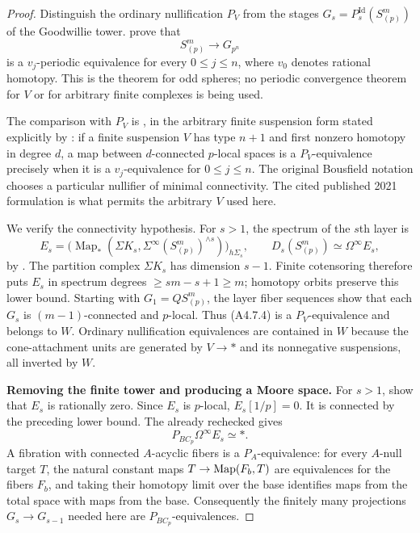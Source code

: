 \begin{proof}
Distinguish the ordinary nullification $P_V$ from the stages
$G_s=P_s^{\mathrm{Id}}(S^m_{(p)})$ of the Goodwillie tower.
\citet[Theorem~4.1, pp.~777--780]{EH5AroneMahowald1999}
prove that
\[
                  S^m_{(p)}\longrightarrow G_{p^n}
                  \tag{A4.7.4}
\]
is a $v_j$-periodic equivalence for every $0\leq j\leq n$,
where $v_0$ denotes rational homotopy.  This is the theorem
for odd spheres; no periodic convergence theorem for $V$ or
for arbitrary finite complexes is being used.

The comparison with $P_V$ is
\citet[Corollary~4.8, with the conventions of Section~4.3]{A3Bousfield2001Telescopic},
in the arbitrary finite suspension form stated explicitly by
\citet[Theorem~3.1, p.~8]{A4BarthelHeutsMeier2021}:
if a finite suspension $V$ has type $n+1$ and first nonzero
homotopy in degree $d$, a map between $d$-connected $p$-local
spaces is a $P_V$-equivalence precisely when it is a
$v_j$-equivalence for $0\leq j\leq n$.
The original Bousfield notation chooses a particular nullifier
of minimal connectivity.  The cited published 2021 formulation
is what permits the arbitrary $V$ used here.

We verify the connectivity hypothesis.  For $s>1$, the spectrum
of the $s$th layer is
\[
 E_s=\bigl(\operatorname{Map}_*(\Sigma K_s,
              \Sigma^\infty(S^m_{(p)})^{\wedge s})\bigr)_{h\Sigma_s},
 \qquad D_s(S^m_{(p)})\simeq\Omega^\infty E_s,
 \tag{A4.7.5}
\]
by \citet[Theorem~2.1]{EH5AroneMahowald1999}.
The partition complex $\Sigma K_s$ has dimension $s-1$.
Finite cotensoring therefore puts $E_s$ in spectrum degrees
$\geq sm-s+1\geq m$; homotopy orbits preserve this lower bound.
Starting with $G_1=QS^m_{(p)}$, the layer fiber sequences show
that each $G_s$ is $(m-1)$-connected and $p$-local.  Thus
\textup{(A4.7.4)} is a $P_V$-equivalence and belongs to $W$.
Ordinary nullification equivalences are contained in $W$ because
the cone-attachment units are generated by $V\to*$ and its
nonnegative suspensions, all inverted by $W$.

\par\medskip\noindent\textbf{Removing the finite tower and producing a Moore space.}\quad
For $s>1$, \citet[Proposition~3.1, pp.~758--759]{EH5AroneMahowald1999}
show that $E_s$ is rationally zero.  Since $E_s$ is $p$-local,
$E_s[1/p]=0$.  It is connected by the preceding lower bound.
The already rechecked \citet[Theorem~3.2]{ALevy} gives
\[
                         P_{BC_p}\Omega^\infty E_s\simeq *.
                         \tag{A4.7.6}
\]
A fibration with connected $A$-acyclic fibers is a
$P_A$-equivalence: for every $A$-null target $T$, the natural
constant maps $T\to\operatorname{Map}(F_b,T)$ are equivalences for the
fibers $F_b$, and taking their homotopy limit over the base
identifies maps from the total space with maps from the base.
Consequently the finitely many projections
$G_s\to G_{s-1}$ needed here are $P_{BC_p}$-equivalences.


\end{proof}
